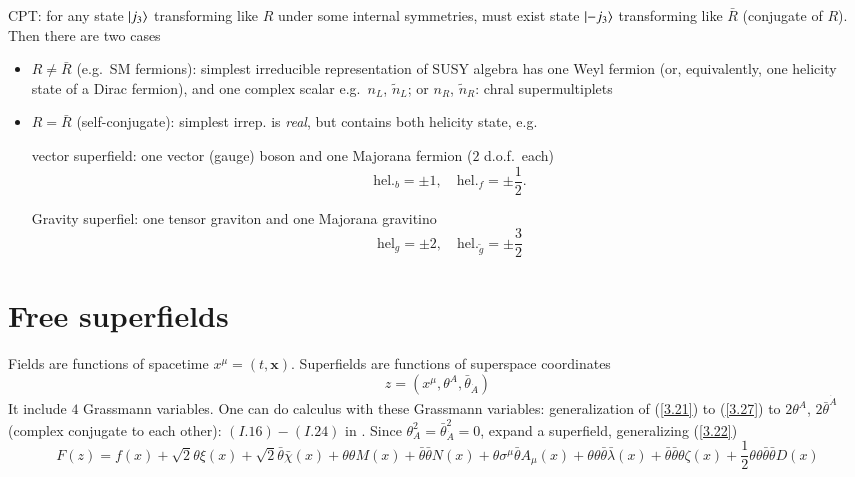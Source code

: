 CPT: for any state $\ket{j_3}$ transforming like $R$ under some internal symmetries, must exist state $\ket{-j_3}$ transforming like $\bar{R}$ (conjugate of $R$). Then there are two cases
\begin{itemize}
   \item $R\neq \bar{R}$ (e.g.~SM fermions): simplest irreducible representation of SUSY algebra has one Weyl fermion (or, equivalently, one helicity state of a Dirac fermion), and one complex scalar e.g.~$n_L$, $\tilde{n}_L$; or $n_R$, $\tilde{n}_R$: chral supermultiplets \label{3.90}
\item $R=\bar{R}$ (self-conjugate): simplest irrep. is \textit{real}, but contains both helicity state, e.g.~

   vector superfield: one vector (gauge) boson and one Majorana fermion ($2$ d.o.f.~each)
   \begin{equation}
   \text{hel.}_b = \pm 1, \quad \text{hel.}_f = \pm \frac{1}{2} 
   \label{3.91} .
   \end{equation}

   Gravity superfiel: one tensor graviton and one Majorana gravitino 
   \begin{equation}
      \text{hel}_g = \pm 2, \quad \text{hel.}_{\tilde{g}} = \pm \frac{3}{2} 
   \label{3.92}
   \end{equation}
\end{itemize}

\section{Free superfields} 
Fields are functions of spacetime $x^\mu = (t, \pmb{x})$.
Superfields are functions of superspace coordinates
\begin{equation}
   z = (x^\mu, \theta^A, \bar{\theta}_{\dot{A}})    \label{3.93}
\end{equation}
It include $4$ Grassmann variables. One can do calculus with these Grassmann variables: generalization of (\ref{3.21}) to (\ref{3.27}) to $2 \theta^A$, $2 \bar{\theta}^{\dot{A}}$ (complex conjugate to each other): $(I.16)-(I.24)$ in \cite{drees_id}.
Since $\theta_A^2 = \bar{\theta}_{\dot{A}}^2 = 0$, expand a superfield, generalizing (\ref{3.22})
\begin{equation}
   F(z) = f(x) + \sqrt{2} \theta \xi(x) + \sqrt{2} \bar{\theta} \bar{\chi}(x) + \theta \theta M(x) + \bar{\theta} \bar{\theta} N(x) + \theta \sigma^\mu \bar{\theta}A_\mu (x) + \theta \theta \bar{\theta} \bar{\lambda}(x) + \bar{\theta}\bar{\theta} \theta \zeta (x) + \frac{1}{2} \theta\theta\bar{\theta}\bar{\theta} D(x) \label{3.94}
\end{equation}

